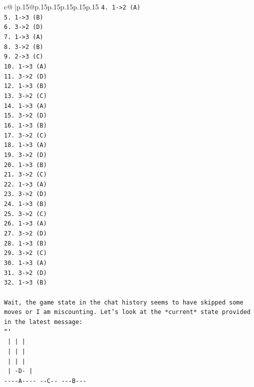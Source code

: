 \documentclass{article}
\begin{document}
{\begin{supertabular}{c@{$\;$}|p{.15\linewidth}@{}p{.15\linewidth}p{.15\linewidth}p{.15\linewidth}p{.15\linewidth}p{.15\linewidth}}
{{{\texttt{4. 1{-}>2 (A)} \\
\texttt{5. 1{-}>3 (B)} \\
\texttt{6. 3{-}>2 (D)} \\
\texttt{7. 1{-}>3 (A)} \\
\texttt{8. 3{-}>2 (B)} \\
\texttt{9. 2{-}>3 (C)} \\
\texttt{10. 1{-}>3 (A)} \\
\texttt{11. 3{-}>2 (D)} \\
\texttt{12. 1{-}>3 (B)} \\
\texttt{13. 3{-}>2 (C)} \\
\texttt{14. 1{-}>3 (A)} \\
\texttt{15. 3{-}>2 (D)} \\
\texttt{16. 1{-}>3 (B)} \\
\texttt{17. 3{-}>2 (C)} \\
\texttt{18. 1{-}>3 (A)} \\
\texttt{19. 3{-}>2 (D)} \\
\texttt{20. 1{-}>3 (B)} \\
\texttt{21. 3{-}>2 (C)} \\
\texttt{22. 1{-}>3 (A)} \\
\texttt{23. 3{-}>2 (D)} \\
\texttt{24. 1{-}>3 (B)} \\
\texttt{25. 3{-}>2 (C)} \\
\texttt{26. 1{-}>3 (A)} \\
\texttt{27. 3{-}>2 (D)} \\
\texttt{28. 1{-}>3 (B)} \\
\texttt{29. 3{-}>2 (C)} \\
\texttt{30. 1{-}>3 (A)} \\
\texttt{31. 3{-}>2 (D)} \\
\texttt{32. 1{-}>3 (B)} \\
\\ 
\texttt{Wait, the game state in the chat history seems to have skipped some moves or I am miscounting. Let's look at the *current* state provided in the latest message:} \\
\texttt{```} \\
\texttt{    |         |         |    } \\
\texttt{    |         |         |    } \\
\texttt{    |         |         |    } \\
\texttt{    |        {-}D{-}        |    } \\
\texttt{{-}{-}{-}{-}A{-}{-}{-}{-}   {-}{-}C{-}{-}    {-}{-}{-}B{-}{-}{-} } \\
}}}
\end{supertabular}}
\end{document}
